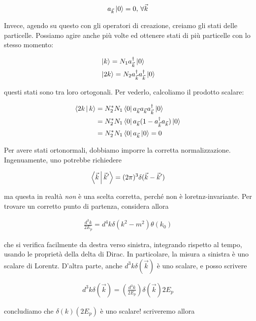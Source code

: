 \documentclass[11pt]{report}
\begin{document}
\begin{align}
    a_{\vec{k}} \ket{0} = 0, \, \forall \vec{k}
\end{align}

Invece, agendo su questo con gli operatori di creazione, creiamo gli stati delle particelle. Possiamo agire anche più volte ed ottenere stati di più particelle con lo stesso momento: 

\begin{align}
    &\ket{k} = N_1 a^\dagger_{\vec{k}}\ket{0} \\
    &\ket{2k} = N_2 a^\dagger_{\vec{k}}a^\dagger_{\vec{k}}\ket{0}
\end{align}

questi stati sono tra loro ortogonali. Per vederlo, calcoliamo il prodotto scalare: 

\begin{align}
    \Braket{2k | k} &= N_2^*N_1 \bra{0}a_{\vec{k}}a_{\vec{k}}a^\dagger_{\vec{k}}\ket{0} \\
    &= N_2^* N_1 \bra{0}a_{\vec{k}}(1-a^\dagger_{\vec{k}}a_{\vec{k}})\ket{0} \\
    &= N_2^*N_1 \bra{0}a_{\vec{k}} \ket{0} = 0 
\end{align}

Per avere stati ortonormali, dobbiamo imporre la corretta normalizzazione. Ingenuamente, uno potrebbe richiedere 

\begin{align}
    \Braket{\vec{k} | \vec{k}'} = (2\pi)^3\delta(\vec{k}-\vec{k}')
\end{align}

ma questa in realtà \emph{non} è una scelta corretta, perché non è loretnz-invariante. Per trovare un corretto punto di partenza, considera allora 

\begin{align}
    \frac{d^3 k}{2E_p} = d^4k \delta(k^2 - m^2)\theta(k_0)
\end{align}

che si verifica facilmente da destra verso sinistra, integrando rispetto al tempo, usando le proprietà della delta di Dirac. In particolare, la misura a sinistra è uno scalare di Lorentz. D'altra parte, anche \(d^3k \delta(\vec{k})\) è uno scalare, e posso scrivere 

\begin{align}
    d^3k \delta(\vec{k}) = \left(\frac{d^3k}{2E_p}\right)\delta(\vec{k})2E_p
\end{align}

concludiamo che \(\delta(k)(2E_p)\) è uno scalare! scriveremo allora 
\end{document}
